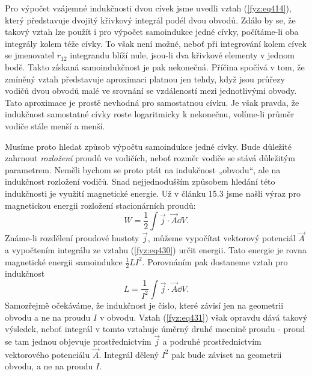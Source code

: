 {  Pro výpočet vzájemné indukčnosti dvou cívek jsme uvedli vztah (\ref{fyz:eq414}), který 
  představuje dvojitý křivkový integrál podél dvou obvodů. Zdálo by se, že takový vztah lze použít 
  i pro výpočet samoindukce jedné cívky, počítáme-li oba integrály kolem téže cívky. To však není 
  možné, neboť při integrování kolem cívek se jmenovatel \(r_{12}\) integrandu blíží nule, jsou-li 
  dva křivkové elementy v jednom bodě. Takto získaná samoindukčnost je pak nekonečná. Příčina 
  spočívá v tom, že zmíněný vztah představuje aproximaci platnou jen tehdy, když jsou průřezy 
  vodičů dvou obvodů malé ve srovnání se vzdáleností mezi jednotlivými obvody. Tato aproximace je 
  prostě nevhodná pro samostatnou cívku. Je však pravda, že indukčnost samostatné cívky roste 
  logaritmicky k nekonečnu, volíme-li průměr vodiče stále menší a menší. 
  
  Musíme proto hledat způsob výpočtu samoindukce jedné cívky. Bude důležité zahrnout 
  \emph{rozložení} proudů ve vodičích, neboť rozměr vodiče se stává důležitým parametrem. Neměli 
  bychom se proto ptát na indukčnost „obvodu“, ale na indukčnost rozložení vodičů. Snad 
  nejjednodušším způsobem hledání této indukčnosti je využití magnetické energie. Už v článku 15.3 
  jsme našli výraz pro magnetickou energii rozložení stacionárních proudů:
  \begin{equation}\label{fyz:eq430}
    W = \frac{1}{2}\int\vec{j}\cdot\vec{A}\dd{V}.
  \end{equation}
  Známe-li rozdělení proudové hustoty \(\vec{j}\), můžeme vypočítat vektorový potenciál \(\vec{A}\) 
  a vypočtením integrálu ze vztahu (\ref{fyz:eq430}) určit energii. Tato energie je rovna 
  magnetické energii samoindukce \(\frac{1}{2}LI^2\). Porovnáním pak dostaneme vztah pro indukčnost
  \begin{equation}\label{fyz:eq431}
    L = \frac{1}{I^2}\int\vec{j}\cdot\vec{A}\dd{V}.
  \end{equation}
  Samozřejmě očekáváme, že indukčnost je číslo, které závisí jen na geometrii obvodu a ne na proudu 
  \(I\) v obvodu. Vztah (\ref{fyz:eq431}) však opravdu dává takový výsledek, neboť integrál v tomto 
  vztahuje úměrný druhé mocnině proudu - proud se tam jednou objevuje prostřednictvím \(\vec{j}\) a 
  podruhé prostřednictvím vektorového potenciálu \(\vec{A}\). Integrál dělený \(I^2\) pak bude 
  záviset na geometrii obvodu, a ne na proudu \(I\).
  
}
